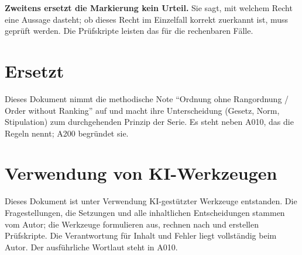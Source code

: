 \textbf{Zweitens ersetzt die Markierung kein Urteil.} Sie sagt, mit welchem
Recht eine Aussage dasteht; ob dieses Recht im Einzelfall korrekt zuerkannt ist,
muss geprüft werden. Die Prüfskripte leisten das für die rechenbaren Fälle.

\section{Ersetzt}

Dieses Dokument nimmt die methodische Note \enquote{Ordnung ohne Rangordnung /
Order without Ranking} auf und macht ihre Unterscheidung (Gesetz, Norm,
Stipulation) zum durchgehenden Prinzip der Serie. Es steht neben A010, das die
Regeln nennt; A200 begründet sie.

\section{Verwendung von KI-Werkzeugen}

Dieses Dokument ist unter Verwendung KI-gestützter Werkzeuge entstanden. Die
Fragestellungen, die Setzungen und alle inhaltlichen Entscheidungen stammen vom
Autor; die Werkzeuge formulieren aus, rechnen nach und erstellen Prüfskripte.
Die Verantwortung für Inhalt und Fehler liegt vollständig beim Autor. Der
ausführliche Wortlaut steht in A010.
